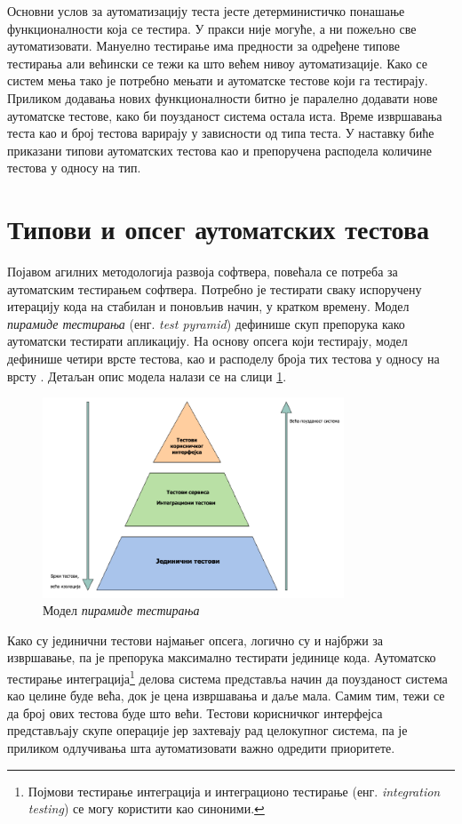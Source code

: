 \documentclass[12pt,oneside]{memoir}
\begin{document}
Основни услов за аутоматизацију теста јесте детерминистичко понашање функционалности која се тестира. У пракси није могуће, а ни пожељно све аутоматизовати. Мануелно тестирање има предности за одређене типове тестирања али већински се тежи ка што већем нивоу аутоматизације. Како се систем мења тако је потребно мењати и аутоматске тестове који га тестирају. Приликом додавања нових функционалности битно је паралелно додавати нове аутоматске тестове, како би поузданост система остала иста. Време извршавања теста као и број тестова варирају у зависности од типа теста. У наставку биће приказани типови аутоматских тестова као и препоручена расподела количине тестова у односу на тип.


\section{Типови и опсег аутоматских тестова}

Појавом агилних методологија развоја софтвера, повећала се потреба за аутоматским тестирањем софтвера. Потребно је тестирати сваку испоручену итерацију кода на стабилан и поновљив начин, у кратком времену. Модел \textit{пирамиде тестирања} (енг. \textit{test pyramid}) дефинише скуп препорука како аутоматски тестирати апликацију. На основу опсега који тестирају, модел дефинише четири врсте тестова, као и расподелу броја тих тестова у односу на врсту \cite{microservicesBook}. 
Детаљан опис модела налази се на слици \ref{fig:piramida}.

\begin{figure}[!ht]
  \centering
  \includegraphics[width=0.8\textwidth]{matfmaster/img/piramida.png}
  \caption{Модел \textit{пирамиде тестирања}}
  \label{fig:piramida}
\end{figure}

Како су јединични тестови најмањег опсега, логично су и најбржи за извршавање, па је препорука максимално тестирати јединице кода. Аутоматско тестирање интеграција\footnote{Појмови тестирање интеграција и интеграционо тестирање (енг. \textit{integration testing}) се могу користити као синоними.} делова система представља начин да поузданост система као целине буде већа, док је цена извршавања и даље мала. Самим тим, тежи се да број ових тестова буде што већи. Тестови корисничког интерфејса представљају скупе операције јер захтевају рад целокупног система, па је приликом одлучивања шта аутоматизовати важно одредити приоритете.
\end{document}
